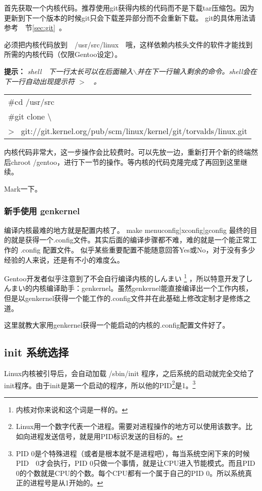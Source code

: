 \documentclass[amstex,twoside]{ctexbook}
\newenvironment{code}{\small\tt\begin{longtable}{p{0.8\textwidth}}}{\end{longtable}}
\newcommand{\secref}[1]{节\ref{#1}~\nameref{#1}}
\begin{document}
首先获取一个内核代码。推荐使用git获得内核的代码而不是下载tar压缩包。因为更新到下一个版本的时候git只会下载差异部分而不会重新下载。
git的具体用法请参考　\secref{sec:git}。

必须把内核代码放到　/usr/src/linux　哦，这样依赖内核头文件的软件才能找到所需的内核代码（仅限Gentoo设定）。

{
\bf\noindent 提示：
}{
\em shell　下一行太长可以在后面输入$\backslash$并在下一行输入剩余的命令。shell会在下一行自动出现提示符 $>$　。
}


\begin{code}
\#cd /usr/src\\
\#git clone \textbackslash \\
>~ git://git.kernel.org/pub/scm/linux/kernel/git/torvalds/linux.git
\end{code}

内核代码非常大，这一步操作会比较费时。可以先放一边，重新打开个新的终端然后chroot /gentoo，进行下一节的操作。等内核的代码克隆完成了再回到这里继续。

Mark一下。

\subsubsection{新手使用 genkernel}

编译内核最难的地方就是配置内核了。 make menuconfig|xconfig|gconfig 最终的目的就是获得一个.config文件。其实后面的编译步骤都不难，难的就是一个能正常工作的 .config 配置文件。
似乎某些重要配置不能随意回答Yes或No，对于没有多少经验的人来说，还是有不小的难度么。

Gentoo开发者似乎注意到了不会自行编译内核的しんまい%
\footnote{内核对你来说和这个词是一样的。}%
，所以特意开发了しんまい的内核编译助手：genkernel。虽然genkernel能直接编译出一个工作内核，
但是以genkernel获得一个能工作的.config文件并在此基础上修改定制才是修炼之道。

这里就教大家用genkernel获得一个能启动的内核的.config配置文件好了。


\subsection{init 系统选择}
Linux内核被引导后，会自动加载 /sbin/init 程序，之后系统的启动就完全交给了init程序。由于init是第一个启动的程序，所以他的PID\footnote{Linux用一个数字代表一个进程。需要对进程操作的地方可以使用该数字。比如向进程发送信号，就是用PID标识发送的目标的。}是1。\footnote{PID 0是个特殊进程（或者是根本就不是进程吧），每当系统空闲下来的时候PID　0才会执行，PID 0只做一个事情，就是让CPU进入节能模式。而且PID　0的个数就是CPU的个数。每个CPU都有一个属于自己的PID 0。所以系统真正的进程号是从1开始的。}
\end{document}
